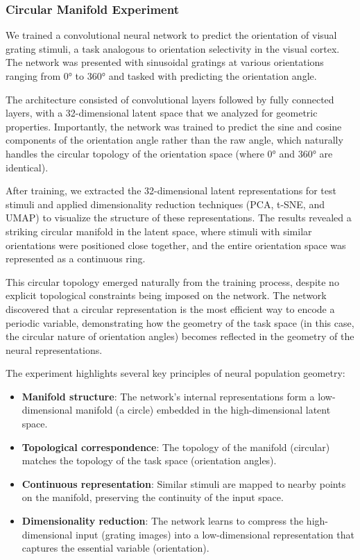 \documentclass[11pt,a4paper]{article}
\begin{document}
\subsubsection{Circular Manifold Experiment}

We trained a convolutional neural network to predict the orientation of visual grating stimuli, a task analogous to orientation selectivity in the visual cortex. The network was presented with sinusoidal gratings at various orientations ranging from 0° to 360° and tasked with predicting the orientation angle.

The architecture consisted of convolutional layers followed by fully connected layers, with a 32-dimensional latent space that we analyzed for geometric properties. Importantly, the network was trained to predict the sine and cosine components of the orientation angle rather than the raw angle, which naturally handles the circular topology of the orientation space (where 0° and 360° are identical).

After training, we extracted the 32-dimensional latent representations for test stimuli and applied dimensionality reduction techniques (PCA, t-SNE, and UMAP) to visualize the structure of these representations. The results revealed a striking circular manifold in the latent space, where stimuli with similar orientations were positioned close together, and the entire orientation space was represented as a continuous ring.

This circular topology emerged naturally from the training process, despite no explicit topological constraints being imposed on the network. The network discovered that a circular representation is the most efficient way to encode a periodic variable, demonstrating how the geometry of the task space (in this case, the circular nature of orientation angles) becomes reflected in the geometry of the neural representations.

The experiment highlights several key principles of neural population geometry:

\begin{itemize}
    \item \textbf{Manifold structure}: The network's internal representations form a low-dimensional manifold (a circle) embedded in the high-dimensional latent space.
    \item \textbf{Topological correspondence}: The topology of the manifold (circular) matches the topology of the task space (orientation angles).
    \item \textbf{Continuous representation}: Similar stimuli are mapped to nearby points on the manifold, preserving the continuity of the input space.
    \item \textbf{Dimensionality reduction}: The network learns to compress the high-dimensional input (grating images) into a low-dimensional representation that captures the essential variable (orientation).
\end{itemize}
\end{document}
